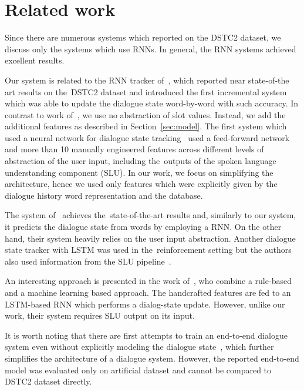 \documentclass{itatnew}
\begin{document}
\section{Related work}\label{sec:related}
Since there are numerous systems which reported on the DSTC2 dataset, we discuss only the systems which use RNNs.
In general, the RNN systems achieved excellent results.

Our system is related to the RNN tracker of~\citet{zilka2015incremental},
which reported near state-of-the art results on the~DSTC2 dataset and introduced the first incremental system which was able to update the dialogue state word-by-word with such accuracy.
In contrast to work of~\citet{zilka2015incremental}, we use no abstraction of slot values. 
Instead, we add the additional features as described in Section~\ref{sec:model}.
The first system which used a neural network for dialogue state tracking~\cite{henderson2013deep} used a feed-forward network and more than 10 manually engineered features across different levels of abstraction of the user input, including the~outputs of the spoken language understanding component (SLU).
In our work, we focus on simplifying the architecture, hence we used only features which were explicitly given by the dialogue history word representation and the database.

The system of~\citet{henderson2014word} achieves the~state-of-the-art results and, similarly to our system, it predicts the dialogue state from words by employing a RNN.
On the other hand, their system heavily relies on the user input abstraction.
Another dialogue state tracker with LSTM was used in the~reinforcement setting but the authors also used information from the SLU pipeline~\cite{lee2016dialog}.

An interesting approach is presented in the work of~\citet{vodolan2015hybrid}, who combine a rule-based and a machine learning based approach.
The handcrafted features are fed to an LSTM-based RNN which performs a dialog-state update.
However, unlike our work, their system requires SLU output on its input.

It is worth noting that there are first attempts to train an end-to-end dialogue system even without explicitly modeling the dialogue state~\cite{bordes2016learning}, which further simplifies the architecture of a dialogue system.
However, the reported end-to-end model was evaluated only on artificial dataset and cannot be compared to DSTC2 dataset directly.
\end{document}
